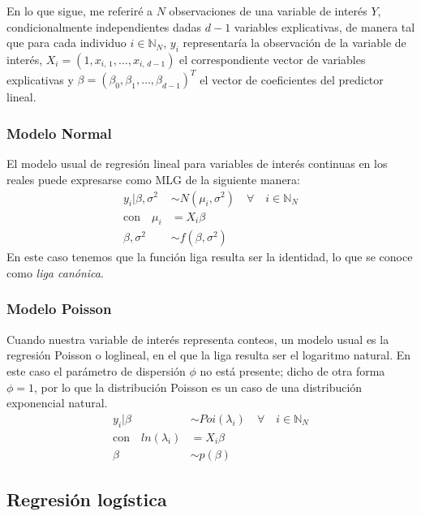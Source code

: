 En lo que sigue, me referiré a $N$ observaciones de una variable de interés $Y$, condicionalmente independientes dadas $d-1$ variables explicativas, de manera tal que para cada individuo $i\in \mathbb{N}_N$, $y_i$ representaría la observación de la variable de interés, $X_i = (1, x_{i,\,1}, \dots ,x_{i,\,d-1})$ el correspondiente vector de variables explicativas y $\beta=(\beta_0, \beta_1, \dots, \beta_{d-1})^T$ el vector de coeficientes del predictor lineal.

\subsubsection*{Modelo Normal}

El modelo usual de regresión lineal para variables de interés continuas en los reales puede expresarse como MLG de la siguiente manera: 
\begin{align*}
y_i|\beta,\sigma^2 & \sim N(\mu_i,\sigma^2) \quad \forall \quad i \in \mathbb{N}_N \nonumber \\
\text{con} \quad \mu_i &= X_i\beta \nonumber \\
\beta,\sigma^2 &\sim f(\beta,\sigma^2)
\end{align*}
En este caso tenemos que la función liga resulta ser la identidad, lo que se conoce como \textit{liga canónica}. 

\subsubsection*{Modelo Poisson}

Cuando nuestra variable de interés representa conteos, un modelo usual es la regresión Poisson o loglineal, en el que la liga resulta ser el logaritmo natural. En este caso el parámetro de dispersión $\phi$ no está presente; dicho de otra forma $\phi=1$, por lo que la distribución Poisson es un caso de una distribución exponencial natural. 
\begin{align*}
y_i|\beta & \sim Poi(\lambda_i) \quad \forall \quad i \in \mathbb{N}_N \nonumber \\
\text{con} \quad ln(\lambda_i) &= X_i\beta \nonumber \\
\beta &\sim p(\beta)
\end{align*}

\subsection{Regresión logística}

